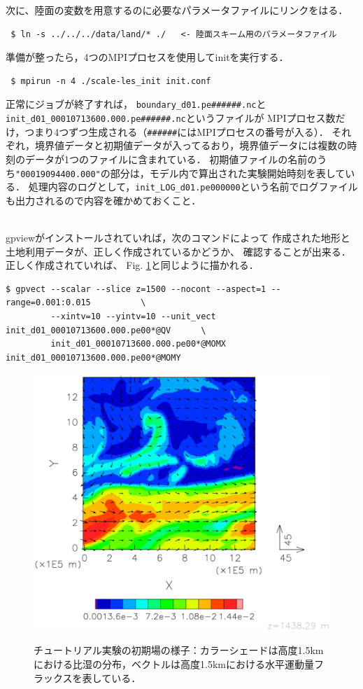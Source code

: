 次に、陸面の変数を用意するのに必要なパラメータファイルにリンクをはる．
\begin{verbatim}
 $ ln -s ../../../data/land/* ./   <- 陸面スキーム用のパラメータファイル
\end{verbatim}
準備が整ったら，4つのMPIプロセスを使用してinitを実行する．
\begin{verbatim}
 $ mpirun -n 4 ./scale-les_init init.conf
\end{verbatim}

正常にジョブが終了すれば，
\verb|boundary_d01.pe######.nc|と\verb|init_d01_00010713600.000.pe######.nc|というファイルが
MPIプロセス数だけ，つまり4つずつ生成される（\verb|######|にはMPIプロセスの番号が入る）．
それぞれ，境界値データと初期値データが入ってるおり，境界値データには複数の時刻のデータが1つのファイルに含まれている．
初期値ファイルの名前のうち\verb|"00019094400.000"|の部分は，モデル内で算出された実験開始時刻を表している．
処理内容のログとして，\verb|init_LOG_d01.pe000000|という名前でログファイルも出力されるので内容を確かめておくこと．


\vspace{1cm}
\\
gpviewがインストールされていれば，次のコマンドによって
作成された地形と土地利用データが、正しく作成されているかどうか、
確認することが出来る．正しく作成されていれば、
Fig. \ref{fig:init}と同じように描かれる．

\begin{verbatim}
$ gpvect --scalar --slice z=1500 --nocont --aspect=1 --range=0.001:0.015          \
         --xintv=10 --yintv=10 --unit_vect init_d01_00010713600.000.pe00*@QV      \
         init_d01_00010713600.000.pe00*@MOMX init_d01_00010713600.000.pe00*@MOMY
\end{verbatim}


\begin{figure}[h]
\begin{center}
  \includegraphics[width=0.7\hsize]{./figure/init_qv-momxy.eps}\\
  \caption{チュートリアル実験の初期場の様子：カラーシェードは高度1.5kmにおける比湿の分布，ベクトルは高度1.5kmにおける水平運動量フラックスを表している．}
  \label{fig:init}
\end{center}
\end{figure}

